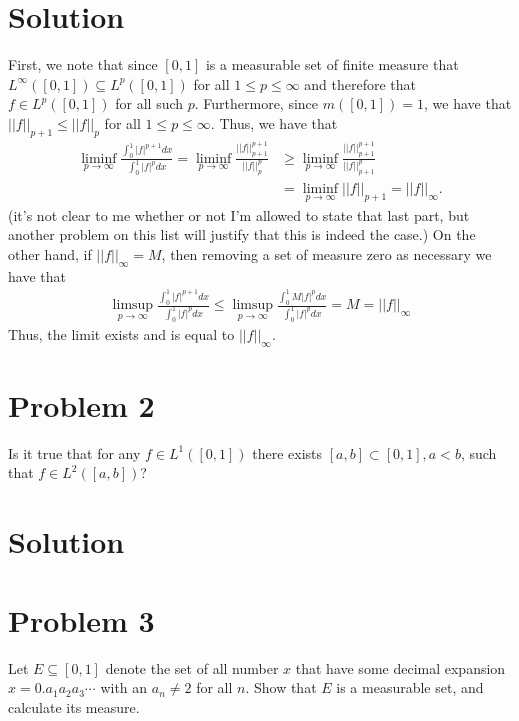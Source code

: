 \documentclass{article}
\begin{document}
\section*{Solution}
First, we note that since $[0,1]$ is a measurable set of finite measure that $L^{\infty}([0,1])\subseteq L^p([0,1])$ for all $1\leq p\leq\infty$ and therefore that $f\in L^p([0,1])$ for all such $p$.  Furthermore, since $m([0,1])=1$, we have that $||f||_{p+1}\leq||f||_p$ for all $1\leq p\leq\infty$.  Thus, we have that
\begin{align*}
\liminf_{p\rightarrow\infty}\frac{\int_0^1|f|^{p+1}dx}{\int_0^1|f|^pdx}=\liminf_{p\rightarrow\infty}\frac{||f||_{p+1}^{p+1}}{||f||_p^p}&\geq\liminf_{p\rightarrow\infty}\frac{||f||_{p+1}^{p+1}}{||f||_{p+1}^p}\\
&=\liminf_{p\rightarrow\infty} ||f||_{p+1}=||f||_\infty.
\end{align*}
(it's not clear to me whether or not I'm allowed to state that last part, but another problem on this list will justify that this is indeed the case.)  On the other hand, if $||f||_\infty=M$, then removing a set of measure zero as necessary we have that
\begin{align*}
\limsup_{p\rightarrow\infty}\frac{\int_0^1|f|^{p+1}dx}{\int_0^1|f|^pdx}\leq\limsup_{p\rightarrow\infty}\frac{\int_0^1M|f|^pdx}{\int_0^1|f|^pdx}=M=||f||_\infty
\end{align*}
Thus, the limit exists and is equal to $||f||_\infty$.

\section*{Problem 2}
Is it true that for any $f\in L^1([0,1])$ there exists $[a,b]\subset[0,1],a<b$, such that $f\in L^2([a,b])$?\\

\section*{Solution}

\section*{Problem 3}
Let $E\subseteq[0,1]$ denote the set of all number $x$ that have some decimal expansion $x=0.a_1a_2a_3\cdots$ with an $a_n\neq2$ for all $n$.  Show that $E$ is a measurable set, and calculate its measure.\\
\end{document}
